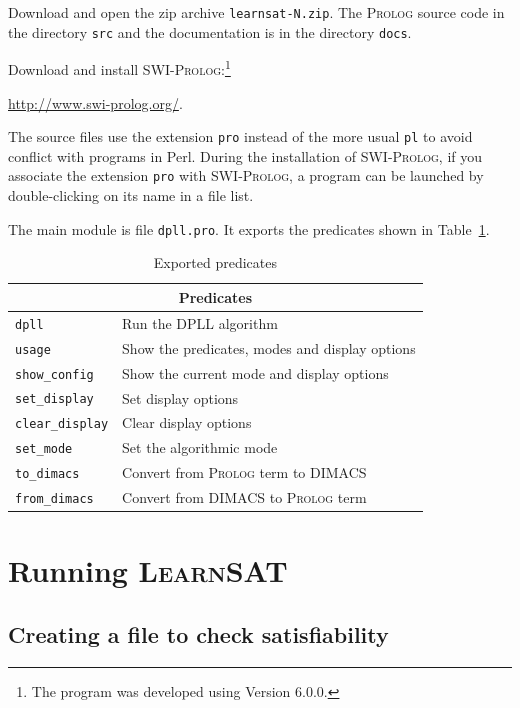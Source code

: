 \documentclass[11pt]{report}
\newcommand*{\p}[1]{\textup{\texttt{#1}}}
\newcommand*{\ls}{\textsc{LearnSAT}}
\newcommand*{\pl}{\textsc{Prolog}}
\newcommand*{\sw}{\textsc{SWI-Prolog}}
\begin{document}
Download and open the zip archive \p{learnsat-N.zip}. The \pl{} source
code in the directory \p{src} and the documentation is in the directory
\p{docs}.

Download and install \sw{}:\footnote{The program was developed using
Version 6.0.0.}
\begin{center}
\url{http://www.swi-prolog.org/}.
\end{center}

The source files use the extension \p{pro} instead of the more usual
\p{pl} to avoid conflict with programs in Perl. During the installation
of \sw{}, if you associate the extension \p{pro} with \sw{}, a
program can be launched by double-clicking on its name in a file list. 

The main module is file \p{dpll.pro}. It exports the predicates shown in
Table~\ref{tab.export}.

\begin{table}
\begin{center}
\begin{tabular}{|l|l|}
\hline
\multicolumn{2}{|c|}{\textbf{\large Predicates}}\\
\hline
\p{dpll}&Run the DPLL algorithm\\
\p{usage}&Show the predicates, modes and display options \\
\p{show\_config}&Show the current mode and display options\\
\p{set\_display}&Set display options\\
\p{clear\_display}&Clear display options\\
\p{set\_mode}&Set the algorithmic mode\\
\p{to\_dimacs}&Convert from \pl{} term to DIMACS\\
\p{from\_dimacs}&Convert from DIMACS to \pl{} term\\
\hline
\end{tabular}
\end{center}
\caption{Exported predicates}\label{tab.export}
\end{table}


\section{Running \ls}

\subsection{Creating a file to check satisfiability}
\end{document}
